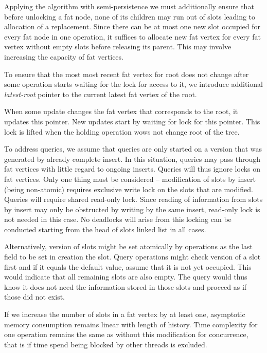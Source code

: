 Applying the algorithm with semi-persistence we must additionally ensure that before unlocking a fat node, none of its children may run out of slots leading to allocation of a replacement. Since there can be at most one new slot occupied for every fat node in one operation, it suffices to allocate new fat vertex for every fat vertex without empty slots before releasing its parent. This may involve increasing the capacity of fat vertices.

To ensure that the most most recent fat vertex for root does not change after some operation starts waiting for the lock for access to it, we introduce additional \emph{latest-root} pointer to the current latest fat vertex of the root. 

When some update changes the fat vertex that corresponds to the root, it updates this pointer. New updates start by waiting for lock for this pointer. This lock is lifted when the holding operation wows not change root of the tree.

To address queries, we assume that queries are only started on a version that was generated by already complete insert. In this situation, queries may pass through fat vertices with little regard to ongoing inserts. Queries will thus ignore locks on fat vertices. Only one thing must be considered -- modification of slots by insert (being non-atomic) requires exclusive write lock on the slots that are modified. Queries will require shared read-only lock. Since reading of information from slots by insert may only be obstructed by writing by the same insert, read-only lock is not needed in this case. No deadlocks will arise from this locking can be conducted starting from the head of slots linked list in all cases. 

Alternatively, version of slots might be set atomically by operations as the last field to be set in creation the slot. Query operations might check version of a slot first and if it equals the default value, assume that it is not yet occupied. This would indicate that all remaining slots are also empty. The query would thus know it does not need the information stored in those slots and proceed as if those did not exist.

If we increase the number of slots in a fat vertex by at least one, asymptotic memory consumption remains linear with length of history. Time complexity for one operation remains the same as without this modification for concurrence, that is if time spend being blocked by other threads is excluded.

